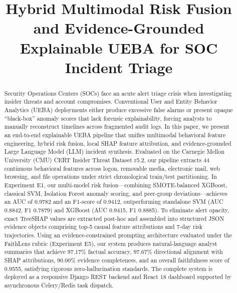 \documentclass[conference]{IEEEtran}
\begin{document}
\title{Hybrid Multimodal Risk Fusion and Evidence-Grounded Explainable UEBA for SOC Incident Triage}

\author{
}

\maketitle

\begin{abstract}
Security Operations Centers (SOCs) face an acute alert triage crisis when investigating insider threats and account compromises. Conventional User and Entity Behavior Analytics (UEBA) deployments either produce excessive false alarms or present opaque ``black-box'' anomaly scores that lack forensic explainability, forcing analysts to manually reconstruct timelines across fragmented audit logs. In this paper, we present an end-to-end explainable UEBA pipeline that unifies multimodal behavioral feature engineering, hybrid risk fusion, local SHAP feature attribution, and evidence-grounded Large Language Model (LLM) incident synthesis. Evaluated on the Carnegie Mellon University (CMU) CERT Insider Threat Dataset r5.2, our pipeline extracts 44 continuous behavioral features across logon, removable media, electronic mail, web browsing, and file operations under strict chronological train/test partitioning. In Experiment E1, our multi-model risk fusion---combining SMOTE-balanced XGBoost, classical SVM, Isolation Forest anomaly scoring, and peer-group deviations---achieves an AUC of 0.9782 and an F1-score of 0.9412, outperforming standalone SVM (AUC 0.8842, F1 0.7879) and XGBoost (AUC 0.9415, F1 0.8885). To eliminate alert opacity, exact TreeSHAP values are extracted post-hoc and assembled into structured JSON evidence objects comprising top-5 causal feature attributions and 7-day risk trajectories. Using an evidence-constrained prompting architecture evaluated under the FaithLens rubric (Experiment E5), our system produces natural-language analyst summaries that achieve 97.17\% factual accuracy, 97.67\% directional alignment with SHAP attributions, 90.00\% evidence completeness, and an overall faithfulness score of 0.9555, satisfying rigorous zero-hallucination standards. The complete system is deployed as a responsive Django REST backend and React 18 dashboard supported by asynchronous Celery/Redis task dispatch.
\end{abstract}
\end{document}
